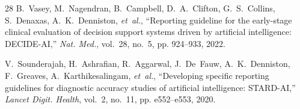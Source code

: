 \documentclass[journal]{IEEEtran}
\begin{document}
\begin{thebibliography}{28}
B.~Vasey, M.~Nagendran, B.~Campbell, D.~A.~Clifton, G.~S.~Collins, S.~Denaxas, A.~K.~Denniston, \emph{et~al.}, ``Reporting guideline for the early-stage clinical evaluation of decision support systems driven by artificial intelligence: {DECIDE-AI},'' \emph{Nat. Med.}, vol.~28, no.~5, pp. 924--933, 2022.

V.~Sounderajah, H.~Ashrafian, R.~Aggarwal, J.~De~Fauw, A.~K.~Denniston, F.~Greaves, A.~Karthikesalingam, \emph{et~al.}, ``Developing specific reporting guidelines for diagnostic accuracy studies of artificial intelligence: {STARD-AI},'' \emph{Lancet Digit. Health}, vol.~2, no.~11, pp. e552--e553, 2020.

\end{thebibliography}
\end{document}
